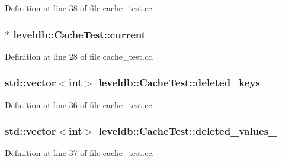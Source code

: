 Definition at line 38 of file cache\+\_\+test.\+cc.

\hypertarget{classleveldb_1_1_cache_test_a91ef57f644d0531b882caed9547759f6}{}
\subsubsection[{current\+\_\+}]{ $\ast$ leveldb\+::\+Cache\+Test\+::current\+\_\+\hspace{0.3cm}{\ttfamily [static]}}\label{classleveldb_1_1_cache_test_a91ef57f644d0531b882caed9547759f6}


Definition at line 28 of file cache\+\_\+test.\+cc.

\hypertarget{classleveldb_1_1_cache_test_aad6b825748f29b973a8934682eb50ed2}{}
\subsubsection[{deleted\+\_\+keys\+\_\+}]{\setlength{\rightskip}{0pt plus 5cm}std\+::vector$<$int$>$ leveldb\+::\+Cache\+Test\+::deleted\+\_\+keys\+\_\+}\label{classleveldb_1_1_cache_test_aad6b825748f29b973a8934682eb50ed2}


Definition at line 36 of file cache\+\_\+test.\+cc.

\hypertarget{classleveldb_1_1_cache_test_add979edecc72f9740b1d6d4951c13c02}{}
\subsubsection[{deleted\+\_\+values\+\_\+}]{\setlength{\rightskip}{0pt plus 5cm}std\+::vector$<$int$>$ leveldb\+::\+Cache\+Test\+::deleted\+\_\+values\+\_\+}\label{classleveldb_1_1_cache_test_add979edecc72f9740b1d6d4951c13c02}


Definition at line 37 of file cache\+\_\+test.\+cc.

\hypertarget{classleveldb_1_1_cache_test_a101eeca736aed0fde7048d0bf21b7e0a}{}
